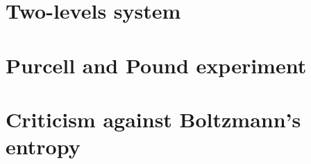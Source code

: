 \documentclass[]{article}
\begin{document}
\section{Two-levels system}
\label{sec:TLS}


\newpage

\section{Purcell and Pound experiment}
\label{sec:PandP}


\newpage

\section{Criticism against Boltzmann's entropy}
\label{sec:entropy}


\newpage

\printbibliography
\end{document}
